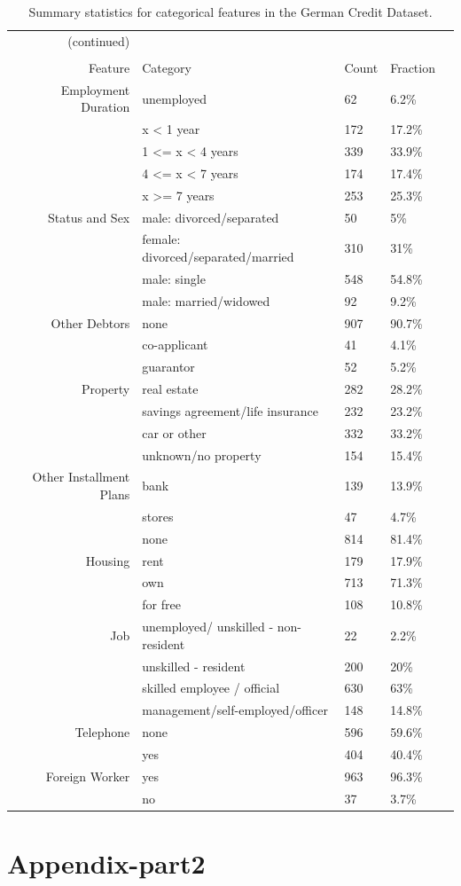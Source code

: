 \documentclass[12pt]{article}
\begin{document}
\begin{table}[!ht]
\centering
\begin{tabular}{rllll}
 (continued)& & &\\ \\
\hline
Feature & Category & Count & Fraction \\ 
  \hline
 Employment Duration & unemployed & 62 & 6.2\% \\ 
&x < 1 year & 172 & 17.2\% \\ 
&1  <= x < 4 years & 339 & 33.9\% \\ 
&4  <= x < 7 years & 174 & 17.4\% \\ 
&x >= 7 years & 253 & 25.3\% \\ 
\hline
Status and Sex & male: divorced/separated & 50 & 5\% \\ 
&female: divorced/separated/married & 310 & 31\% \\ 
&male: single & 548 & 54.8\% \\ 
&male: married/widowed & 92 & 9.2\% \\ 
\hline
 Other Debtors & none & 907 & 90.7\% \\ 
&co-applicant & 41 & 4.1\% \\ 
&guarantor & 52 & 5.2\% \\ 
\hline
  Property & real estate & 282 & 28.2\% \\ 
&savings agreement/life insurance & 232 & 23.2\% \\ 
&car or other& 332 & 33.2\% \\ 
&unknown/no property & 154 & 15.4\% \\ 
\hline
 Other Installment Plans & bank & 139 & 13.9\% \\ 
&stores & 47 & 4.7\% \\ 
&none & 814 & 81.4\% \\ 
\hline
Housing & rent & 179 & 17.9\% \\ 
&own & 713 & 71.3\% \\ 
&for free & 108 & 10.8\% \\ 
\hline
 Job & unemployed/ unskilled  - non-resident & 22 & 2.2\% \\ 
 & unskilled - resident & 200 & 20\% \\ 
 &skilled employee / official & 630 & 63\% \\ 
 &management/self-employed/officer & 148 & 14.8\% \\ 
 \hline
Telephone & none & 596 & 59.6\% \\ 
&yes & 404 & 40.4\% \\ 
 \hline
Foreign Worker & yes & 963 & 96.3\% \\ 
&no & 37 & 3.7\% \\ 
    \hline
\end{tabular}
\caption{Summary statistics for categorical features in the German Credit Dataset.}\label{summary_categorical}
\end{table}



\newpage
\section{Appendix-part2}

\clearpage


\end{document}
